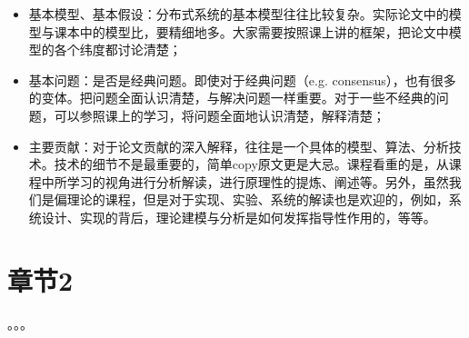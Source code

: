 \documentclass[UTF8]{article}
\begin{document}
\begin{itemize}
    \item 基本模型、基本假设：分布式系统的基本模型往往比较复杂。实际论文中的模型与课本中的模型比，要精细地多。大家需要按照课上讲的框架，把论文中模型的各个纬度都讨论清楚；
    
    \item 基本问题：是否是经典问题。即使对于经典问题（e.g. consensus），也有很多的变体。把问题全面认识清楚，与解决问题一样重要。对于一些不经典的问题，可以参照课上的学习，将问题全面地认识清楚，解释清楚；
    
    \item 主要贡献：对于论文贡献的深入解释，往往是一个具体的模型、算法、分析技术。技术的细节不是最重要的，简单copy原文更是大忌。课程看重的是，从课程中所学习的视角进行分析解读，进行原理性的提炼、阐述等。另外，虽然我们是偏理论的课程，但是对于实现、实验、系统的解读也是欢迎的，例如，系统设计、实现的背后，理论建模与分析是如何发挥指导性作用的，等等。
    
     
\end{itemize}


\section{章节2}

。。。
    
\end{document}

